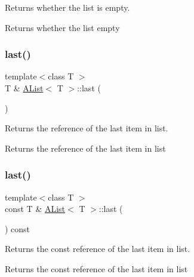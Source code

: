 Returns whether the list is empty. 

\begin{DoxyReturn}{Returns}
whether the list empty 
\end{DoxyReturn}
\mbox{\label{class_a_list_a41b07290930bbfa06ec02f9106a52b74}} 
\subsubsection{\texorpdfstring{last()}{last()}\hspace{0.1cm}{\footnotesize\ttfamily [1/2]}}
{\footnotesize\ttfamily template$<$class T $>$ \\
T \& \mbox{\hyperlink{class_a_list}{A\+List}}$<$ T $>$\+::last (\begin{DoxyParamCaption}{ }\end{DoxyParamCaption})}



Returns the reference of the last item in list. 

\begin{DoxyReturn}{Returns}
the reference of the last item in list 
\end{DoxyReturn}
\mbox{\label{class_a_list_ab6c0fc542c318f68199ef3b4d97c82f4}} 
\subsubsection{\texorpdfstring{last()}{last()}\hspace{0.1cm}{\footnotesize\ttfamily [2/2]}}
{\footnotesize\ttfamily template$<$class T $>$ \\
const T \& \mbox{\hyperlink{class_a_list}{A\+List}}$<$ T $>$\+::last (\begin{DoxyParamCaption}{ }\end{DoxyParamCaption}) const}



Returns the const reference of the last item in list. 

\begin{DoxyReturn}{Returns}
the const reference of the last item in list 
\end{DoxyReturn}
\mbox{\label{class_a_list_a6e83dd4da23beeda52e15e8a2cc9f799}} 
